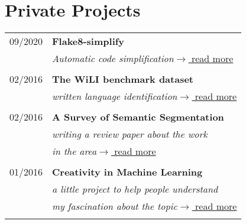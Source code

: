 \documentclass[a4paper,10pt]{article} %
\begin{document}
{\begin{minipage}[t]{0.5\textwidth}
\end{minipage} %
\hfill
\begin{minipage}[t]{0.44\textwidth}
\vspace{0pt} %


\section{Private Projects}



\begin{tabular}{rl}
09/2020  & \textbf{Flake8-simplify}\\
& \textit{Automatic code simplification}\hfill \href{https://github.com/MartinThoma/flake8-simplify}{$\rightarrow$ read more}\\ \\

02/2016  & \textbf{The WiLI benchmark dataset}\\
& \textit{written language identification}\hfill \href{https://arxiv.org/abs/1801.07779}{$\rightarrow$ read more}\\ \\

02/2016  & \textbf{A Survey of Semantic Segmentation}\\
& \textit{writing a review paper about the work }\\
& \textit{in the area}\hfill \href{https://arxiv.org/abs/1602.06541}{$\rightarrow$ read more}\\ \\

01/2016  & \textbf{Creativity in Machine Learning}\\
& \textit{a little project to help people understand}\\
& \textit{my fascination about the topic}\hfill \href{https://arxiv.org/abs/1601.03642}{$\rightarrow$ read more}\\ \\


\end{tabular}
\end{minipage}}
\end{document}
